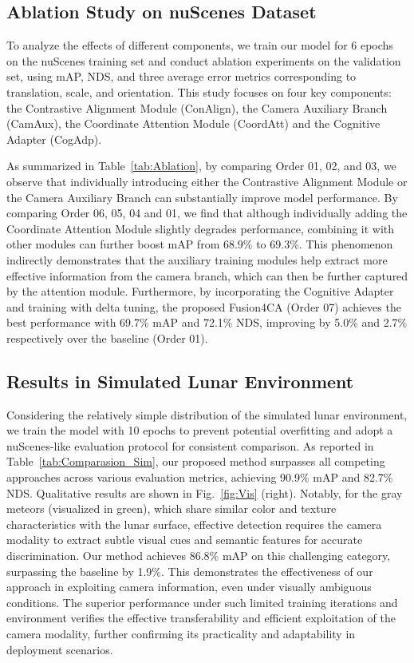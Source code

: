 \documentclass[letterpaper, 10 pt, conference]{ieeeconf}  %
\begin{document}
\subsection{Ablation Study on nuScenes Dataset}
To analyze the effects of different components, we train our model for 6 epochs on the nuScenes training set and conduct ablation experiments on the validation set, using mAP, NDS, and three average error metrics corresponding to translation, scale, and orientation. This study focuses on four key components: the Contrastive Alignment Module (ConAlign), the Camera Auxiliary Branch (CamAux), the Coordinate Attention Module (CoordAtt) and the Cognitive Adapter (CogAdp). 

As summarized in Table~\ref{tab:Ablation}, by comparing Order 01, 02, and 03, we observe that individually introducing either the Contrastive Alignment Module or the Camera Auxiliary Branch can substantially improve model performance. By comparing Order 06, 05, 04 and 01, we find that although individually adding the Coordinate Attention Module slightly degrades performance, combining it with other modules can further boost mAP from 68.9\% to 69.3\%. This phenomenon indirectly demonstrates that the auxiliary training modules help extract more effective information from the camera branch, which can then be further captured by the attention module. Furthermore, by incorporating the Cognitive Adapter and training with delta tuning, the proposed Fusion4CA (Order 07) achieves the best performance with 69.7\% mAP and 72.1\% NDS, improving by 5.0\% and 2.7\% respectively over the baseline (Order 01).

\subsection{Results in Simulated Lunar Environment}
Considering the relatively simple distribution of the simulated lunar environment, we train the model with 10 epochs to prevent potential overfitting and adopt a nuScenes-like evaluation protocol for consistent comparison. As reported in Table~\ref{tab:Comparasion_Sim}, our proposed method surpasses all competing approaches across various evaluation metrics, achieving 90.9\% mAP and 82.7\% NDS. Qualitative results are shown in Fig.~\ref{fig:Vis} (right). 
Notably, for the gray meteors (visualized in green), which share similar color and texture characteristics with the lunar surface, effective detection requires the camera modality to extract subtle visual cues and semantic features for accurate discrimination. Our method achieves 86.8\% mAP on this challenging category, surpassing the baseline by 1.9\%. This demonstrates the effectiveness of our approach in exploiting camera information, even under visually ambiguous conditions.
The superior performance under such limited training iterations and environment verifies the effective transferability and efficient exploitation of the camera modality, further confirming its practicality and adaptability in deployment scenarios.  
\end{document}
